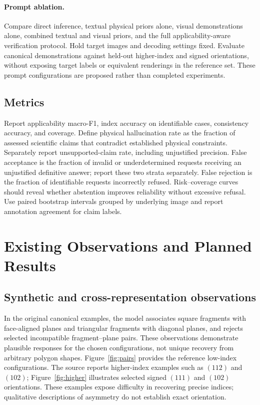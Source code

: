 \documentclass[11pt]{article}
\begin{document}
\paragraph{Prompt ablation.} Compare direct inference, textual physical priors alone, visual demonstrations alone, combined textual and visual priors, and the full applicability-aware verification protocol. Hold target images and decoding settings fixed. Evaluate canonical demonstrations against held-out higher-index and signed orientations, without exposing target labels or equivalent renderings in the reference set. These prompt configurations are proposed rather than completed experiments.
\subsection{Metrics}
Report applicability macro-F1, index accuracy on identifiable cases, consistency accuracy, and coverage. Define physical hallucination rate as the fraction of assessed scientific claims that contradict established physical constraints. Separately report unsupported-claim rate, including unjustified precision. False acceptance is the fraction of invalid or underdetermined requests receiving an unjustified definitive answer; report these two strata separately. False rejection is the fraction of identifiable requests incorrectly refused. Risk--coverage curves should reveal whether abstention improves reliability without excessive refusal. Use paired bootstrap intervals grouped by underlying image and report annotation agreement for claim labels.
\section{Existing Observations and Planned Results}
\subsection{Synthetic and cross-representation observations}
In the original canonical examples, the model associates square fragments with face-aligned planes and triangular fragments with diagonal planes, and rejects selected incompatible fragment--plane pairs. These observations demonstrate plausible responses for the chosen configurations, not unique recovery from arbitrary polygon shapes. Figure~\ref{fig:pairs} provides the reference low-index configurations. The source reports higher-index examples such as $(112)$ and $(102)$; Figure~\ref{fig:higher} illustrates selected signed $(111)$ and $(102)$ orientations. These examples expose difficulty in recovering precise indices; qualitative descriptions of asymmetry do not establish exact orientation.
\end{document}
